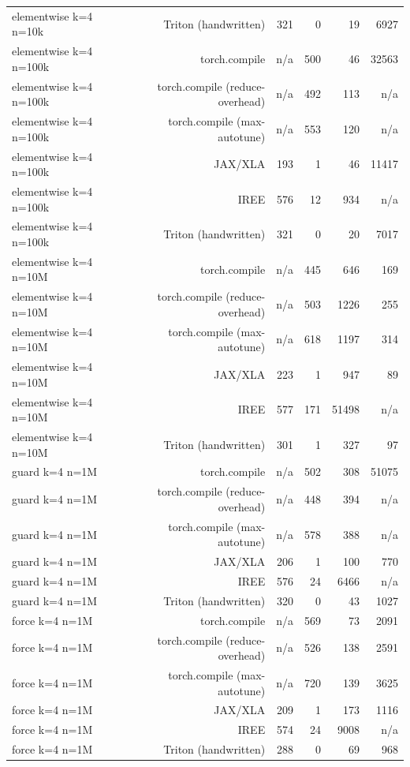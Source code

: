 \begin{tabular}{lrrrrr}
elementwise k=4 n=10k & Triton (handwritten) & 321 & 0 & 19 & 6927 \\
elementwise k=4 n=100k & torch.compile & n/a & 500 & 46 & 32563 \\
elementwise k=4 n=100k & torch.compile (reduce-overhead) & n/a & 492 & 113 & n/a \\
elementwise k=4 n=100k & torch.compile (max-autotune) & n/a & 553 & 120 & n/a \\
elementwise k=4 n=100k & JAX/XLA & 193 & 1 & 46 & 11417 \\
elementwise k=4 n=100k & IREE & 576 & 12 & 934 & n/a \\
elementwise k=4 n=100k & Triton (handwritten) & 321 & 0 & 20 & 7017 \\
elementwise k=4 n=10M & torch.compile & n/a & 445 & 646 & 169 \\
elementwise k=4 n=10M & torch.compile (reduce-overhead) & n/a & 503 & 1226 & 255 \\
elementwise k=4 n=10M & torch.compile (max-autotune) & n/a & 618 & 1197 & 314 \\
elementwise k=4 n=10M & JAX/XLA & 223 & 1 & 947 & 89 \\
elementwise k=4 n=10M & IREE & 577 & 171 & 51498 & n/a \\
elementwise k=4 n=10M & Triton (handwritten) & 301 & 1 & 327 & 97 \\
guard k=4 n=1M & torch.compile & n/a & 502 & 308 & 51075 \\
guard k=4 n=1M & torch.compile (reduce-overhead) & n/a & 448 & 394 & n/a \\
guard k=4 n=1M & torch.compile (max-autotune) & n/a & 578 & 388 & n/a \\
guard k=4 n=1M & JAX/XLA & 206 & 1 & 100 & 770 \\
guard k=4 n=1M & IREE & 576 & 24 & 6466 & n/a \\
guard k=4 n=1M & Triton (handwritten) & 320 & 0 & 43 & 1027 \\
force k=4 n=1M & torch.compile & n/a & 569 & 73 & 2091 \\
force k=4 n=1M & torch.compile (reduce-overhead) & n/a & 526 & 138 & 2591 \\
force k=4 n=1M & torch.compile (max-autotune) & n/a & 720 & 139 & 3625 \\
force k=4 n=1M & JAX/XLA & 209 & 1 & 173 & 1116 \\
force k=4 n=1M & IREE & 574 & 24 & 9008 & n/a \\
force k=4 n=1M & Triton (handwritten) & 288 & 0 & 69 & 968 \\

\end{tabular}
